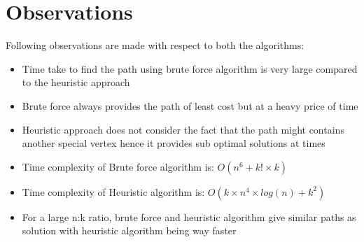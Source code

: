 \documentclass[12pt]{report}
\begin{document}
\section{Observations}

Following observations are made with respect to both the algorithms:
\begin{itemize}
  \item Time take to find the path using brute force algorithm is very large compared to the heuristic approach
  \item Brute force always provides the path of least cost but at a heavy price of time
  \item Heuristic approach does not consider the fact that the path might contains another special vertex hence it provides sub optimal solutions at times
  \item Time complexity of Brute force algorithm is: $O(n^6 + k! \times k)$
  \item Time complexity of Heuristic algorithm is: $O(k \times n^4 \times log(n) + k^2)$
  \item For a large n:k ratio, brute force and heuristic algorithm give similar paths as solution with heuristic algorithm being way faster
  
\end{itemize}
\end{document}
